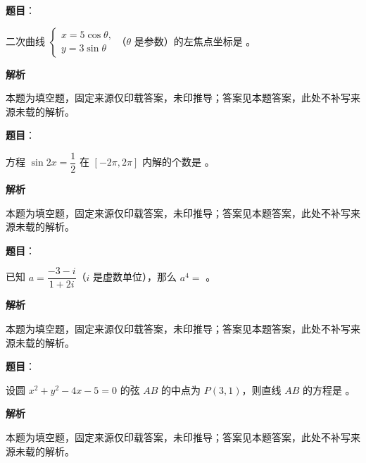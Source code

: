 \begin{answer}

\textbf{题目}：

二次曲线 $\begin{cases}x=5\cos\theta,\\ y=3\sin\theta\end{cases}$（$\theta$ 是参数）的左焦点坐标是 \gkblank{}。

\textbf{解析}

本题为填空题，固定来源仅印载答案，未印推导；答案见本题答案，此处不补写来源未载的解析。


\end{answer}
\begin{answer}

\textbf{题目}：

方程 $\sin 2x=\dfrac12$ 在 $[-2\pi,2\pi]$ 内解的个数是 \gkblank{}。

\textbf{解析}

本题为填空题，固定来源仅印载答案，未印推导；答案见本题答案，此处不补写来源未载的解析。


\end{answer}
\begin{answer}

\textbf{题目}：

已知 $a=\dfrac{-3-i}{1+2i}$（$i$ 是虚数单位），那么 $a^4=$ \gkblank{}。

\textbf{解析}

本题为填空题，固定来源仅印载答案，未印推导；答案见本题答案，此处不补写来源未载的解析。


\end{answer}
\begin{answer}

\textbf{题目}：

设圆 $x^2+y^2-4x-5=0$ 的弦 $AB$ 的中点为 $P(3,1)$，则直线 $AB$ 的方程是 \gkblank{}。

\textbf{解析}

本题为填空题，固定来源仅印载答案，未印推导；答案见本题答案，此处不补写来源未载的解析。


\end{answer}
